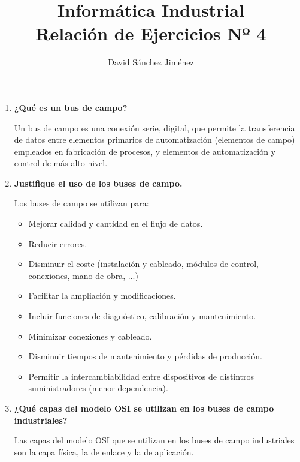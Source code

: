 \documentclass[10pt,a4paper,spanish]{article}
\begin{document}
  \setcounter{section}{0}
  \title{\huge\bf Informática Industrial \\ Relación de Ejercicios Nº 4}
  \author{\large David Sánchez Jiménez}
  \maketitle
  \vspace{3cm}

  \begin{enumerate}

    \item \textbf{¿Qué es un bus de campo?}

    \noindent
    Un bus de campo es una conexión serie, digital, que permite la transferencia de datos entre elementos primarios de automatización (elementos de campo) empleados en fabricación de procesos, y elementos de automatización y control de más alto nivel.

    \item \textbf{Justifique el uso de los buses de campo.}

    \noindent
    Los buses de campo se utilizan para:
    \begin{itemize}
      \item Mejorar calidad y cantidad en el flujo de datos.
      \item Reducir errores.
      \item Disminuir el coste (instalación y cableado, módulos de control, conexiones, mano de obra, ...)
      \item Facilitar la ampliación y modificaciones.
      \item Incluir funciones de diagnóstico, calibración y mantenimiento.
      \item Minimizar conexiones y cableado.
      \item Disminuir tiempos de mantenimiento y pérdidas de producción.
      \item Permitir la intercambiabilidad entre dispositivos de distintros suministradores (menor dependencia).
    \end{itemize}

    \item \textbf{¿Qué capas del modelo OSI se utilizan en los buses de campo industriales?}

    Las capas del modelo OSI que se utilizan en los buses de campo industriales son la capa física, la de enlace y la de aplicación.


\end{enumerate}
\end{document}
